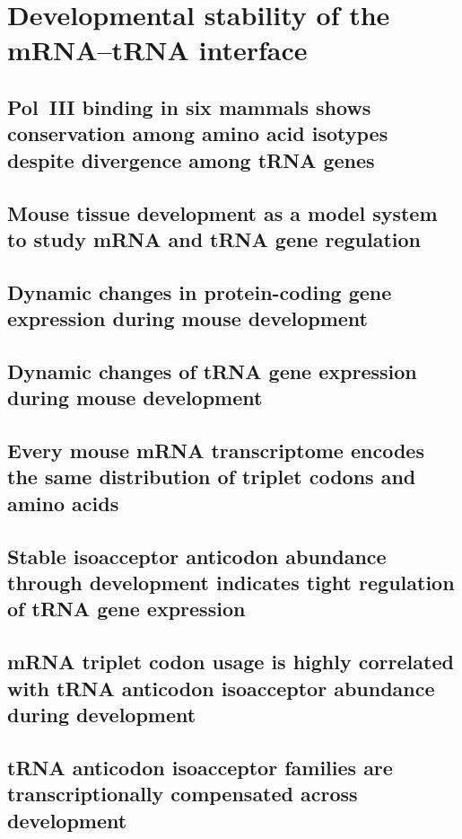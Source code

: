 \chapter{Developmental stability of the mRNA–tRNA interface}

\section{Pol~III binding in six mammals shows conservation among amino acid
isotypes despite divergence among tRNA genes}

\section{Mouse tissue development as a model system to study mRNA and tRNA gene
regulation}

\section{Dynamic changes in protein-coding gene expression during mouse
development}

\section{Dynamic changes of tRNA gene expression during mouse development}

\section{Every mouse mRNA transcriptome encodes the same distribution of
triplet codons and amino acids}

\section{Stable isoacceptor anticodon abundance through development indicates
tight regulation of tRNA gene expression}

\section{mRNA triplet codon usage is highly correlated with tRNA anticodon
isoacceptor abundance during development}

\section{tRNA anticodon isoacceptor families are transcriptionally compensated
across development}
